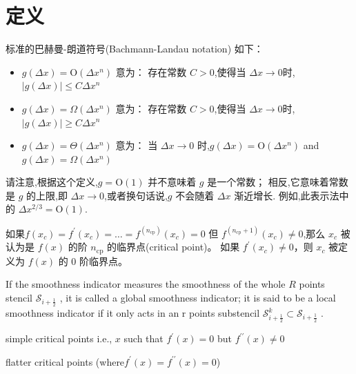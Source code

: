 \documentclass{book}
\begin{document}
\section{定义}
\begin{definition}
    标准的巴赫曼-朗道符号(Bachmann-Landau notation) 如下：

    \begin{itemize}
        \item $g(\Delta x)=\mathrm{O}\left(\Delta x^{n}\right)$  意为： 存在常数 $C>0$,使得当 $\Delta x \rightarrow 0$时,$|g(\Delta x)| \leq C \Delta x^{n}$
        \item $g(\Delta x)=\Omega\left(\Delta x^{n}\right)$ 意为：  存在常数 $C>0$,使得当 $\Delta x \rightarrow 0$时,$|g(\Delta x)| \geq C \Delta x^{n}$
        \item $g(\Delta x)=\Theta\left(\Delta x^{n}\right)$  意为： 当 $\Delta x \rightarrow 0$ 时,$g(\Delta x)=\mathrm{O}\left(\Delta x^{n}\right)$  and  $g(\Delta x)=\Omega\left(\Delta x^{n}\right)$
    \end{itemize}

    请注意,根据这个定义,$g=\mathrm{O}(1)$ 并不意味着 $g$ 是一个常数； 相反,它意味着常数是 $g$ 的上限,即 $\Delta x \rightarrow 0$,或者换句话说,$g$ 不会随着 $\Delta x$ 渐近增长. 例如,此表示法中的 $\Delta x^{2 / 3}=\mathrm{O}(1)$.
\end{definition}
\begin{definition}
    如果$f\left(x_{c}\right)=f^{\prime}\left(x_{c}\right)=\ldots=f^{\left(n_{\mathrm{cp}}\right) }\left(x_{c}\right)=0$ 但 $f^{\left(n_{\mathrm{cp}}+1\right)}\left(x_{c}\right) \neq 0$,那么 $x_{c}$ 被认为是 $f(x)$ 的阶 $n_{\mathrm{cp}}$ 的临界点(critical point)。 如果 $f^{\prime}\left(x_{c}\right) \neq 0$，则 $x_{c}$ 被定义为 $f(x)$ 的 0 阶临界点。
\end{definition}
\begin{definition}
    \cite{WENO-Z-2016}
    If the smoothness indicator measures the smoothness of the whole  $R$  points stencil  $\mathcal{S}_{i+\frac{1}{2}}$ , it is called a global smoothness indicator; it is said to be a local smoothness indicator if it only acts in an  r  points substencil  $\mathcal{S}_{i+\frac{1}{2}}^{k} \subset \mathcal{S}_{i+\frac{1}{2}}$ .
\end{definition}
\begin{definition}
    \cite{WENO-Z-2016}
    simple critical points i.e.,  $x$  such that  $f^{\prime}(x)=0$  but  $f^{\prime \prime}(x) \neq 0$
\end{definition}
\begin{definition}
    \cite{WENO-Z-2016}
    flatter critical points (where$f^{\prime}(x)=f^{\prime \prime}(x)=0$)
\end{definition}
\end{document}
